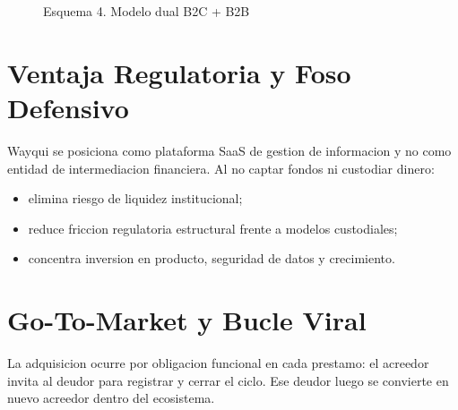 \documentclass[11pt,a4paper]{article}
\begin{document}
\begin{figure}[htbp]
\centering
{}
\caption{Esquema 4. Modelo dual B2C + B2B}
\label{fig:modelo-negocio}
\end{figure}

\section{Ventaja Regulatoria y Foso Defensivo}
Wayqui se posiciona como plataforma SaaS de gestion de informacion y no como entidad de intermediacion financiera. Al no captar fondos ni custodiar dinero:
\begin{itemize}[leftmargin=1.1cm]
	\item elimina riesgo de liquidez institucional;
	\item reduce friccion regulatoria estructural frente a modelos custodiales;
	\item concentra inversion en producto, seguridad de datos y crecimiento.
\end{itemize}

\section{Go-To-Market y Bucle Viral}
La adquisicion ocurre por obligacion funcional en cada prestamo: el acreedor invita al deudor para registrar y cerrar el ciclo. Ese deudor luego se convierte en nuevo acreedor dentro del ecosistema.
\end{document}
